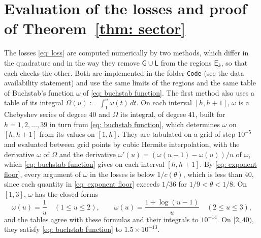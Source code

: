 \documentclass{article}
\numberwithin{equation}{section}
\newcommand{\Le}{\leqslant}
\begin{document}
\section{Evaluation of the losses and proof of \texorpdfstring{Theorem~\ref{thm: sector}}{Theorem 2}}
\label{sec: numerics}

The losses \eqref{eq: loss} are computed numerically by two methods, which differ in the quadrature and in the way they remove $\mathsf{G} \cup \mathsf{L}$ from the regions $\mathsf{E}_k$, so that each checks the other. Both are implemented in the folder \texttt{Code} (see the data availability statement) and use the same limits of the regions and the same table of Buchstab's function $\omega$ of \eqref{eq: buchstab function}. The first method also uses a table of its integral $\Omega(u) := \int_1^u \omega(t)\, dt$. On each interval $[h, h + 1]$, $\omega$ is a Chebyshev series of degree $40$ and $\Omega$ its integral, of degree $41$, built for $h = 1, 2, \dots, 39$ in turn from \eqref{eq: buchstab function}, which determines $\omega$ on $[h, h + 1]$ from its values on $[1, h]$. They are tabulated on a grid of step $10^{-5}$ and evaluated between grid points by cubic Hermite interpolation, with the derivative $\omega$ of $\Omega$ and the derivative $\omega'(u) = (\omega(u - 1) - \omega(u))/u$ of $\omega$, which \eqref{eq: buchstab function} gives on each interval $[h, h + 1]$. By \eqref{eq: exponent floor}, every argument of $\omega$ in the losses is below $1/c(\theta)$, which is less than $40$, since each quantity in \eqref{eq: exponent floor} exceeds $1/36$ for $1/9 < \theta < 1/8$. On $[1, 3]$, $\omega$ has the closed forms
\begin{equation*}
\omega(u) = \frac{1}{u} \quad (1 \Le u \Le 2), \qquad \omega(u) = \frac{1 + \log(u - 1)}{u} \quad (2 \Le u \Le 3),
\end{equation*}
and the tables agree with these formulas and their integrals to $10^{-14}$. On $[2, 40)$, they satisfy \eqref{eq: buchstab function} to $1.5 \times 10^{-13}$.
\end{document}
